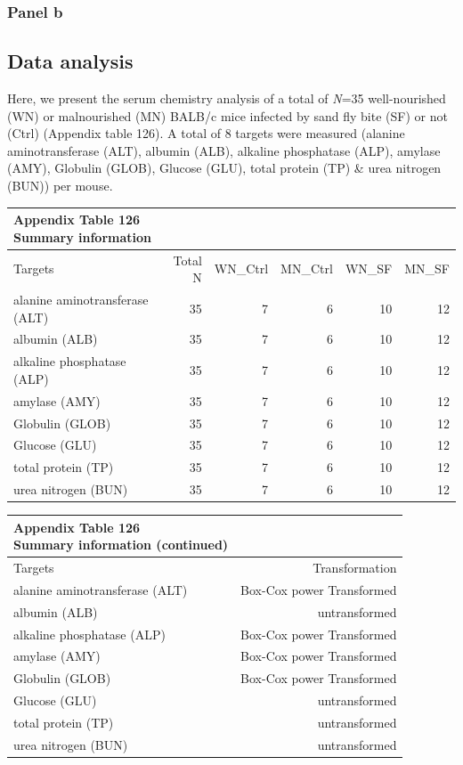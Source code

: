 \documentclass[
  12pt,
  letterpaper,
]{article}
\begin{document}
\subsubsection{Panel b}\label{panel-b-2}

\subsection{Data analysis}\label{data-analysis-7}

Here, we present the serum chemistry analysis of a total of \emph{N}=35 well-nourished (WN) or malnourished (MN) BALB/c mice infected by sand fly bite (SF) or not (Ctrl) (Appendix table 126). A total of 8 targets were measured (alanine aminotransferase (ALT), albumin (ALB), alkaline phosphatase (ALP), amylase (AMY), Globulin (GLOB), Glucose (GLU), total protein (TP) \& urea nitrogen (BUN)) per mouse.

\begingroup
\fontsize{12.0pt}{14.4pt}\selectfont
\begin{longtable}{l|rrrrr}
\caption*{
{\large \textbf{Appendix Table 126}} \\ 
{\small \textbf{Summary information}}
} \\ 
\toprule
Targets & {Total N} & WN\_Ctrl & MN\_Ctrl & WN\_SF & MN\_SF \\ 
\midrule\addlinespace[2.5pt]
alanine aminotransferase (ALT) & 35 & 7 & 6 & 10 & 12 \\ 
albumin (ALB) & 35 & 7 & 6 & 10 & 12 \\ 
alkaline phosphatase (ALP) & 35 & 7 & 6 & 10 & 12 \\ 
amylase (AMY) & 35 & 7 & 6 & 10 & 12 \\ 
Globulin (GLOB) & 35 & 7 & 6 & 10 & 12 \\ 
Glucose (GLU) & 35 & 7 & 6 & 10 & 12 \\ 
total protein (TP) & 35 & 7 & 6 & 10 & 12 \\ 
urea nitrogen (BUN) & 35 & 7 & 6 & 10 & 12 \\ 
\bottomrule
\end{longtable}
\endgroup

\begingroup
\fontsize{12.0pt}{14.4pt}\selectfont
\begin{longtable}{l|r}
\caption*{
{\large \textbf{Appendix Table 126}} \\ 
{\small \textbf{Summary information (continued)}}
} \\ 
\toprule
Targets & {Transformation} \\ 
\midrule\addlinespace[2.5pt]
alanine aminotransferase (ALT) & Box-Cox power Transformed \\ 
albumin (ALB) & untransformed \\ 
alkaline phosphatase (ALP) & Box-Cox power Transformed \\ 
amylase (AMY) & Box-Cox power Transformed \\ 
Globulin (GLOB) & Box-Cox power Transformed \\ 
Glucose (GLU) & untransformed \\ 
total protein (TP) & untransformed \\ 
urea nitrogen (BUN) & untransformed \\ 
\bottomrule
\end{longtable}
\endgroup
\end{document}
